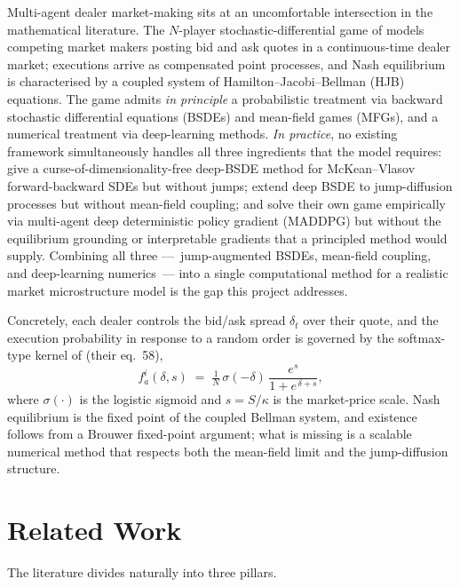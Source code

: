 \documentclass[11pt,a4paper]{article}
\begin{document}
Multi-agent dealer market-making sits at an uncomfortable intersection
in the mathematical literature.  The $N$-player stochastic-differential
game of \citet{cont2024} models competing market makers posting bid and
ask quotes in a continuous-time dealer market; executions arrive as
compensated point processes, and Nash equilibrium is characterised by
a coupled system of Hamilton--Jacobi--Bellman (HJB) equations.  The
game admits \emph{in principle} a probabilistic treatment via backward
stochastic differential equations (BSDEs) and mean-field games (MFGs),
and a numerical treatment via deep-learning methods.  \emph{In
practice}, no existing framework simultaneously handles all three
ingredients that the model requires:
\citet{han2022} give a curse-of-dimensionality-free deep-BSDE method
for McKean--Vlasov forward-backward SDEs but without jumps;
\citet{wang2023} extend deep BSDE to jump-diffusion processes but
without mean-field coupling; and \citet{cont2024} solve their own
game empirically via multi-agent deep deterministic policy gradient
(MADDPG) but without the equilibrium grounding or interpretable
gradients that a principled method would supply.  Combining all three
---~jump-augmented BSDEs, mean-field coupling, and deep-learning
numerics~--- into a single computational method for a realistic market
microstructure model is the gap this project addresses.

Concretely, each dealer controls the bid/ask spread $\delta_t$ over
their quote, and the execution probability in response to a random
order is governed by the softmax-type kernel of \citet{cont2024}
(their eq.~58),
\begin{equation}\label{eq:cx-exec}
  f_a^i(\delta, s) \;=\;
  \tfrac{1}{N}\,\sigma(-\delta)\,
  \frac{e^{s}}{1 + e^{\,\delta + s}},
\end{equation}
where $\sigma(\cdot)$ is the logistic sigmoid and $s = S/\kappa$ is
the market-price scale.  Nash equilibrium is the fixed point of the
coupled Bellman system, and existence follows from a Brouwer
fixed-point argument; what is missing is a scalable numerical
method that respects both the mean-field limit and the
jump-diffusion structure.


\section{Related Work}\label{sec:related}

The literature divides naturally into three pillars.
\end{document}

